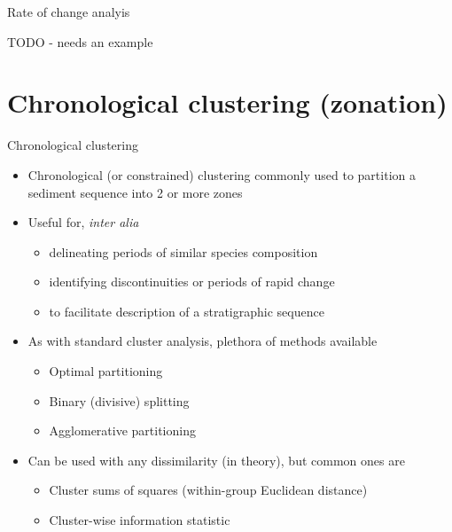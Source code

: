 \documentclass[10pt,ignorenonframetext,compress, aspectratio=169]{beamer}
\providecommand{\tightlist}{%
  \setlength{\itemsep}{0pt}\setlength{\parskip}{0pt}}
\begin{document}
\begin{frame}{Rate of change analyis}

TODO - needs an example

\end{frame}

\section{Chronological clustering
(zonation)}\label{chronological-clustering-zonation-1}

\begin{frame}{Chronological clustering}

\begin{itemize}
\tightlist
\item
  Chronological (or constrained) clustering commonly used to partition a
  sediment sequence into 2 or more zones
\item
  Useful for, \emph{inter alia}

  \begin{itemize}
  \tightlist
  \item
    delineating periods of similar species composition
  \item
    identifying discontinuities or periods of rapid change
  \item
    to facilitate description of a stratigraphic sequence
  \end{itemize}
\item
  As with standard cluster analysis, plethora of methods available

  \begin{itemize}
  \tightlist
  \item
    Optimal partitioning
  \item
    Binary (divisive) splitting
  \item
    Agglomerative partitioning
  \end{itemize}
\item
  Can be used with any dissimilarity (in theory), but common ones are

  \begin{itemize}
  \tightlist
  \item
    Cluster sums of squares (within-group Euclidean distance)
  \item
    Cluster-wise information statistic
  \end{itemize}
\end{itemize}

\end{frame}
\end{document}
